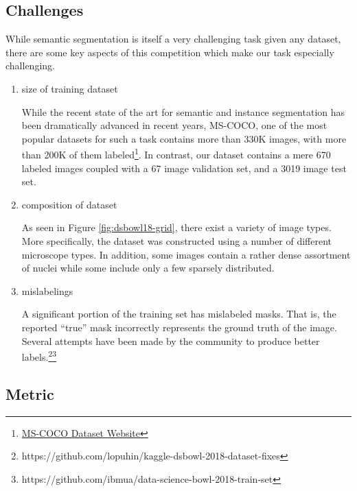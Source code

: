 \documentclass[paper=letter, fontsize=12pt]{article}
\numberwithin{equation}{section} %
\numberwithin{figure}{section} %
\numberwithin{table}{section} %
\begin{document}
\subsection{Challenges}

While semantic segmentation is itself a very challenging task given any
dataset, there are some key aspects of this competition which make our task
especially challenging.
\begin{enumerate}
    \item size of training dataset

        While the recent state of the art for semantic and instance
        segmentation has been dramatically advanced in recent years, MS-COCO,
        one of the most popular datasets for such a task contains more than
        330K images, with more than 200K of them
        labeled\footnote{\href{http://cocodataset.org}{MS-COCO Dataset
        Website}}.  In contrast, our dataset contains a mere 670 labeled images
        coupled with a 67 image validation set, and a 3019 image test set.
    \item composition of dataset

        As seen in Figure \ref{fig:dsbowl18-grid}, there exist a variety of
        image types.  More specifically, the dataset was constructed using a
        number of different microscope types.  In addition, some images contain
        a rather dense assortment of nuclei while some include only a few
        sparsely distributed.
    \item mislabelings

        A significant portion of the training set has mislabeled masks.  That
        is, the reported ``true'' mask incorrectly represents the ground truth
        of the image.  Several attempts have been made by the community to
        produce better
        labels.\footnote{https://github.com/lopuhin/kaggle-dsbowl-2018-dataset-fixes}\footnote{https://github.com/ibmua/data-science-bowl-2018-train-set}
\end{enumerate}

\subsection{Metric}
\end{document}

